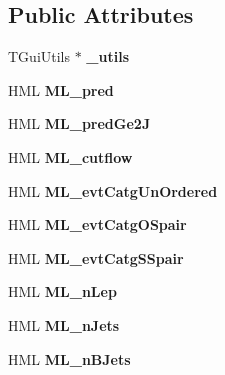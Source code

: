 \subsection*{Public Attributes}
\begin{DoxyCompactItemize}
\item 
\hypertarget{classHistos__3L_ad7050c3b0809b89afe3e33a7bdf00edc}{
TGuiUtils $\ast$ {\bfseries \_\-utils}}
\label{classHistos__3L_ad7050c3b0809b89afe3e33a7bdf00edc}

\item 
\hypertarget{classHistos__3L_aa353fd3a5a0fd545fd6a1df989e69395}{
HML {\bfseries ML\_\-pred}}
\label{classHistos__3L_aa353fd3a5a0fd545fd6a1df989e69395}

\item 
\hypertarget{classHistos__3L_ad6f450fd20e5241c55d391c7ea096aa3}{
HML {\bfseries ML\_\-predGe2J}}
\label{classHistos__3L_ad6f450fd20e5241c55d391c7ea096aa3}

\item 
\hypertarget{classHistos__3L_a29cb06fa81c126a7faf5b587e5bcfcb2}{
HML {\bfseries ML\_\-cutflow}}
\label{classHistos__3L_a29cb06fa81c126a7faf5b587e5bcfcb2}

\item 
\hypertarget{classHistos__3L_a2a8d17cb50411b12118750df2ca9fc00}{
HML {\bfseries ML\_\-evtCatgUnOrdered}}
\label{classHistos__3L_a2a8d17cb50411b12118750df2ca9fc00}

\item 
\hypertarget{classHistos__3L_a381528cba82f33fa55c0d74c6b571927}{
HML {\bfseries ML\_\-evtCatgOSpair}}
\label{classHistos__3L_a381528cba82f33fa55c0d74c6b571927}

\item 
\hypertarget{classHistos__3L_a9d795c3fc2969461b646a6b48fe702aa}{
HML {\bfseries ML\_\-evtCatgSSpair}}
\label{classHistos__3L_a9d795c3fc2969461b646a6b48fe702aa}

\item 
\hypertarget{classHistos__3L_ab3c2f420c7c9a7ecb93047c4203f9b1c}{
HML {\bfseries ML\_\-nLep}}
\label{classHistos__3L_ab3c2f420c7c9a7ecb93047c4203f9b1c}

\item 
\hypertarget{classHistos__3L_a04b24da0f47cd7698109fc9eaefd09ee}{
HML {\bfseries ML\_\-nJets}}
\label{classHistos__3L_a04b24da0f47cd7698109fc9eaefd09ee}

\item 
\hypertarget{classHistos__3L_acd5004bb35c70862327d8e0bb9f5b610}{
HML {\bfseries ML\_\-nBJets}}
\label{classHistos__3L_acd5004bb35c70862327d8e0bb9f5b610}


\end{DoxyCompactItemize}
